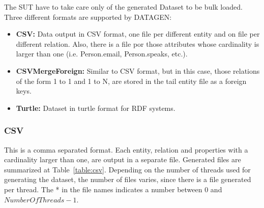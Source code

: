 The SUT have to take care only of the generated Dataset to be bulk loaded.
Three different formats are supported by DATAGEN: 

\begin{itemize}
  \item \textbf{CSV:} Data output in CSV format, one file per different entity and on file
    per different relation. Also, there is a file por those attributes whose
    cardinality is larger than one (i.e. Person.email, Person.speaks, etc.).
  \item \textbf{CSVMergeForeign:} Similar to CSV format, but in this case, those
    relations of the form 1 to 1 and 1 to N, are stored in the tail entity file as
    a foreign keys.
  \item \textbf{Turtle:} Dataset in turtle format for RDF systems.
\end{itemize}



\subsubsection{CSV}

This is a comma separated format. Each entity, relation and properties with a
cardinality larger than one, are output in a separate file. Generated files are
summarized at Table~\ref{table:csv}.  Depending on the number of threads used
for generating the dataset, the number of files varies, since there is a file
generated per thread. The * in the file names indicates a number between 0 and
$NumberOfThreads-1$.

